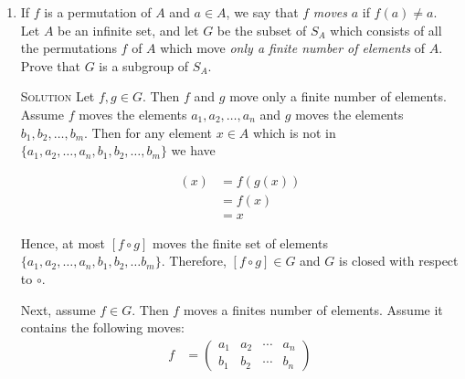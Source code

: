 \documentclass[twoside]{amsart}
\newcommand{\solution}{\textsc{Solution}\xspace}
\begin{document}
\begin{enumerate}[A.]
\begin{enumerate}[1]
	 \noindent \solution Again we must show that $G$ is closed
	 with respect to $\circ$ and with respect to function 
	 inverses.

	 \hspace{.15in}Let $f$ and $g$ both be permutations that are in $G$.
	 Then $[f \circ g](a) = f(g(a)) = f(a) = a$. Therefore $f\circ g$ is in
	 $G$ and therefore $G$ is closed with respect to $\circ$.

	 \hspace{.15in}Again lets choose $f$ such that $f \in G$. We know that
	 $f(a)=a$.  We also know that there exists a function $g \in S_A$ that
	 is the inverse of $f$. We know this because $S_A$ is a group.  By the
	 definition of inverse we know that $y = f(x)$ iff $x = g(y)$. We know
	 that $f(a)=a$, therefore, $g(a)=a$. So $g$ is an inverse of $f$ and
	 $g \in G$, therefore $G$ is closed with respect
	 to inverses.

	 \hspace{.15in}Therefore, $G$ is a subgroup of $S_A$.

	 \item If $f$ is a permutation of $A$ and $a \in A$, we say that $f$
	 \emph{moves} $a$ if $f(a) \ne a$. Let $A$ be an infinite set, and
	 let $G$ be the subset of $S_A$ which consists of all the permutations
	 $f$ of $A$ which move \emph{only a finite number of elements} of $A$.
	 Prove that $G$ is a subgroup of $S_A$.

	 \solution Let $f,g \in G$. Then $f$ and $g$ move only a finite 
	 number of elements. Assume $f$ moves the elements $a_1, a_2, \dots,
	 a_n$ and $g$ moves the elements $b_1, b_2, \dots, b_m$. Then for
	 any element $x \in A$ which is not in $\{a_1, a_2, \dots, a_n, b_1,
	 b_2, \dots, b_m\}$ we have
	 
	 \begin{align*}
	    [f \circ g](x) &= f(g(x)) \\
	                   &= f(x)    \\
			   &= x
	 \end{align*}

	 Hence, at most $[f \circ g]$ moves the finite set of elements
	 $\{a_1, a_2, \dots, a_n, b_1, b_2, \dots b_m\}$. Therefore,
	 $[f\circ g] \in G$ and $G$ is closed with respect to $\circ$.

	 Next, assume $f \in G$. Then $f$ moves a finites number of elements.
	 Assume it contains the following moves:
	 \begin{align*}
	    f & = \begin{pmatrix}
		      a_1 & a_2 & \cdots & a_n  \\
		      b_1 & b_2 & \cdots & b_n 
		  \end{pmatrix} \\
	 \end{align*}


\end{enumerate}
\end{enumerate}
\end{document}
